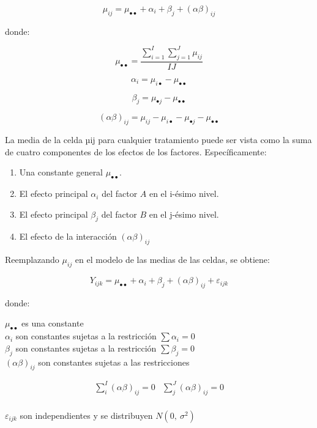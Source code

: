\documentclass[]{book}
\theoremstyle{definition}
\theoremstyle{definition}
\theoremstyle{definition}
\theoremstyle{remark}
\begin{document}
\[
\mu_{ij} = \mu_{\bullet \bullet} + \alpha_{i} + \beta_{j} + \left( \alpha\beta \right)_{ij}
\]

donde:

\[
\mu_{\bullet \bullet} = \frac{\sum_{i = 1}^{I}{\sum_{j = 1}^{J}\mu_{ij}}}{IJ}
\]

\[
\alpha_{i} = \mu_{i \bullet} - \mu_{\bullet \bullet}
\]

\[
\beta_{j} = \mu_{\bullet j} - \mu_{\bullet \bullet}
\]

\[
\left( \alpha\beta \right)_{ij} = \mu_{ij} - \mu_{i \bullet} - \mu_{\bullet j} - \mu_{\bullet \bullet}
\]

La media de la celda µij para cualquier tratamiento puede ser vista como
la suma de cuatro componentes de los efectos de los factores.
Específicamente:

\begin{enumerate}
\def\labelenumi{\arabic{enumi}.}
\item
  Una constante general \(\mu_{\bullet \bullet}\).
\item
  El efecto principal \(\alpha_{i}\) del factor \(A\) en el i-ésimo
  nivel.
\item
  El efecto principal \(\beta_{j}\) del factor \(B\) en el j-ésimo
  nivel.
\item
  El efecto de la interacción \(\left( \alpha\beta \right)_{ij}\)
\end{enumerate}

Reemplazando \(\mu_{ij}\) en el modelo de las medias de las celdas, se
obtiene:

\[
Y_{ijk} = \mu_{\bullet \bullet} + \alpha_{i} + \beta_{j} + \left( \alpha\beta \right)_{ij} + \varepsilon_{ijk}
\]

donde:

\(\mu_{\bullet \bullet}\) es una constante\\
\(\alpha_{i}\) son constantes sujetas a la restricción
\(\sum\alpha_{i} = 0\)\\
\(\beta_{j}\) son constantes sujetas a la restricción
\(\sum\beta_{j} = 0\)\\
\(\left( \alpha\beta \right)_{ij}\) son constantes sujetas a las
restricciones

\[
\begin{matrix}
\sum_{i}^{I}\left( \alpha\beta \right)_{ij} = 0 & \sum_{j}^{J}\left( \alpha\beta \right)_{ij} = 0 \\
\end{matrix}
\]

\(\varepsilon_{ijk}\) son independientes y se distribuyen \(N(0,\
\sigma^{2})\)
\end{document}
